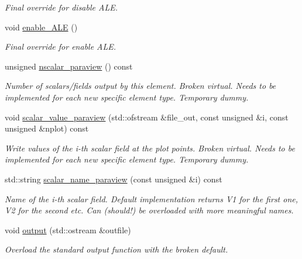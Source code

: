 \begin{DoxyCompactItemize}
\begin{DoxyCompactList}\small\item\em Final override for disable A\+LE. \end{DoxyCompactList}\item 
void \hyperlink{classoomph_1_1BuoyantQCrouzeixRaviartElement_af551bb70aa118a8db4498f41272fe776}{enable\+\_\+\+A\+LE} ()
\begin{DoxyCompactList}\small\item\em Final override for enable A\+LE. \end{DoxyCompactList}\item 
unsigned \hyperlink{classoomph_1_1BuoyantQCrouzeixRaviartElement_a5103e49416e1a0e36a2e8e117fb78623}{nscalar\+\_\+paraview} () const
\begin{DoxyCompactList}\small\item\em Number of scalars/fields output by this element. Broken virtual. Needs to be implemented for each new specific element type. Temporary dummy. \end{DoxyCompactList}\item 
void \hyperlink{classoomph_1_1BuoyantQCrouzeixRaviartElement_a33130eacdbdee41536fce76166c4a769}{scalar\+\_\+value\+\_\+paraview} (std\+::ofstream \&file\+\_\+out, const unsigned \&i, const unsigned \&nplot) const
\begin{DoxyCompactList}\small\item\em Write values of the i-\/th scalar field at the plot points. Broken virtual. Needs to be implemented for each new specific element type. Temporary dummy. \end{DoxyCompactList}\item 
std\+::string \hyperlink{classoomph_1_1BuoyantQCrouzeixRaviartElement_a26f8112d2ba9c77087e534145a2477c9}{scalar\+\_\+name\+\_\+paraview} (const unsigned \&i) const
\begin{DoxyCompactList}\small\item\em Name of the i-\/th scalar field. Default implementation returns V1 for the first one, V2 for the second etc. Can (should!) be overloaded with more meaningful names. \end{DoxyCompactList}\item 
void \hyperlink{classoomph_1_1BuoyantQCrouzeixRaviartElement_a3817706dbf3c755b4029917dac80bad7}{output} (std\+::ostream \&outfile)
\begin{DoxyCompactList}\small\item\em Overload the standard output function with the broken default. \end{DoxyCompactList}\item 

\end{DoxyCompactItemize}
